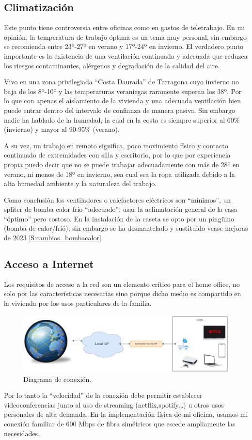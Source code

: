 \subsection{Climatización}
Este punto tiene controversia entre oficinas como en gastos de teletrabajo. En mi opinión, la temperatura de trabajo óptima es un tema muy personal, sin embargo se recomienda entre 23º-27º en verano y 17º-24º en invierno. El verdadero punto importante es la existencia de una ventilación continuada y adecuada que reduzca los riesgos contaminantes, alérgenos y degradación de la calidad del aire.

Vivo en una zona privilegiada “Costa Daurada” de Tarragona cuyo invierno no baja de los 8º-10º y las temperaturas veraniegas raramente superan los 38º. Por lo que con apenas el aislamiento de la vivienda y una adecuada ventilación bien puede entrar dentro del intervalo de confianza de manera pasiva. Sin embargo nadie ha hablado de la humedad, la cual en la costa es siempre superior al 60\% (invierno) y mayor al 90-95\% (verano).

A su vez, un trabajo en remoto significa, poco movimiento físico y contacto continuado de extremidades con silla y escritorio, por lo que por experiencia propia puedo decir que no se puede trabajar adecuadamente con más de 28º en verano, ni menos de 18º en invierno, sea cual sea la ropa utilizada debido a la alta humedad ambiente y la naturaleza del trabajo.

Como conclusión los ventiladores o calefactores eléctricos son “mínimos”, un spliter de bomba calor frío “adecuado”, usar la aclimatación general de la casa “óptimo” pero costoso. En la instalación de la caseta se opto por un pingüino (bomba de calor/frió), sin embargo se ha desmantelado y sustituido vease mejoras de 2023 \ref{S:cambios_bombacalor}.

\subsection{Acceso a Internet}
Los requisitos de acceso a la red son un elemento crítico para el home office, no solo por las características necesarias sino porque dicho medio es compartido en la vivienda por los usos particulares de la familia. 
\begin{figure}[!htb]
\begin{center}
\includegraphics[width=1\textwidth]{./figuras/conexion.jpg}
\caption{Diagrama de conexión. }
\label{F:conexion}
\end{center}
\end{figure}
Por lo tanto la “velocidad” de la conexión debe permitir establecer videoconferencias junto al uso de streaming (netflix,spotify…) u otros usos personales de alta demanda. En la implementación física de mi oficina, usamos mi conexión familiar de 600 Mbps de fibra simétricos que escede ampliamente las necesidades.

